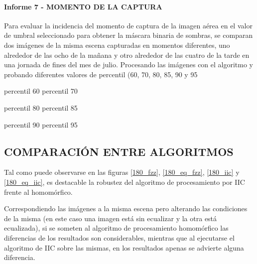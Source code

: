\paragraph{Informe 7 - MOMENTO DE LA CAPTURA}
Para evaluar la incidencia del momento de captura de la imagen aérea en el valor de umbral seleccionado para obtener la máscara binaria de sombras, se comparan dos imágenes de la misma escena capturadas en momentos diferentes, uno alrededor de las ocho de la mañana y otro alrededor de las cuatro de la tarde en una jornada de fines del mes de julio. Procesando las imágenes con el algoritmo y probando diferentes valores de percentil (60, 70, 80, 85, 90 y 95 %



percentil 60	percentil 70



percentil 80	percentil 85



percentil 90	percentil 95



\color{black}


\subsection{COMPARACIÓN ENTRE ALGORITMOS}
Tal como puede observarse en las figuras \ref{180_fzz}, \ref{180_eq_fzz}, \ref{180_iic} y \ref{180_eq_iic}, es destacable la robustez del algoritmo de procesamiento por IIC frente al homomórfico. 

Correspondiendo las imágenes a la misma escena pero alterando las condiciones de la misma (en este caso una imagen está sin ecualizar y la otra está ecualizada), si se someten al algoritmo de procesamiento homomórfico las diferencias de los resultados son considerables, mientras que al ejecutarse el algoritmo de IIC sobre las mismas, en los resultados apenas se advierte alguna diferencia.